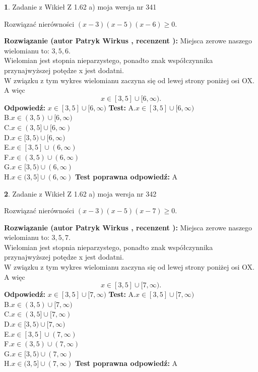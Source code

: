 \documentclass[12pt, a4paper]{article}
\theoremstyle{definition} %
\newtheorem{zad}{}
\newcommand{\zadStart}[1]{\begin{zad}#1\newline}
\newcommand{\zadStop}{\end{zad}}
\newcommand{\rozwStart}[2]{\noindent \textbf{Rozwiązanie (autor #1 , recenzent #2): }\newline}
\newcommand{\rozwStop}{\newline}
\newcommand{\odpStart}{\noindent \textbf{Odpowiedź:}\newline}
\newcommand{\odpStop}{\newline}
\newcommand{\testStart}{\noindent \textbf{Test:}\newline}
\newcommand{\testStop}{\newline}
\newcommand{\kluczStart}{\noindent \textbf{Test poprawna odpowiedź:}\newline}
\newcommand{\kluczStop}{\newline}
\begin{document}
\zadStart{Zadanie z Wikieł Z 1.62 a) moja wersja nr 341}

Rozwiązać nierówności $(x-3)(x-5)(x-6)\ge0$.
\zadStop
\rozwStart{Patryk Wirkus}{}
Miejsca zerowe naszego wielomianu to: $3, 5, 6$.\\
Wielomian jest stopnia nieparzystego, ponadto znak współczynnika przy\linebreak najwyższej potędze x jest dodatni.\\ W związku z tym wykres wielomianu zaczyna się od lewej strony poniżej osi OX. A więc $$x \in [3,5] \cup [6,\infty).$$
\rozwStop
\odpStart
$x \in [3,5] \cup [6,\infty)$
\odpStop
\testStart
A.$x \in [3,5] \cup [6,\infty)$\\
B.$x \in (3,5) \cup [6,\infty)$\\
C.$x \in (3,5] \cup [6,\infty)$\\
D.$x \in [3,5) \cup [6,\infty)$\\
E.$x \in [3,5] \cup (6,\infty)$\\
F.$x \in (3,5) \cup (6,\infty)$\\
G.$x \in [3,5) \cup (6,\infty)$\\
H.$x \in (3,5] \cup (6,\infty)$
\testStop
\kluczStart
A
\kluczStop



\zadStart{Zadanie z Wikieł Z 1.62 a) moja wersja nr 342}

Rozwiązać nierówności $(x-3)(x-5)(x-7)\ge0$.
\zadStop
\rozwStart{Patryk Wirkus}{}
Miejsca zerowe naszego wielomianu to: $3, 5, 7$.\\
Wielomian jest stopnia nieparzystego, ponadto znak współczynnika przy\linebreak najwyższej potędze x jest dodatni.\\ W związku z tym wykres wielomianu zaczyna się od lewej strony poniżej osi OX. A więc $$x \in [3,5] \cup [7,\infty).$$
\rozwStop
\odpStart
$x \in [3,5] \cup [7,\infty)$
\odpStop
\testStart
A.$x \in [3,5] \cup [7,\infty)$\\
B.$x \in (3,5) \cup [7,\infty)$\\
C.$x \in (3,5] \cup [7,\infty)$\\
D.$x \in [3,5) \cup [7,\infty)$\\
E.$x \in [3,5] \cup (7,\infty)$\\
F.$x \in (3,5) \cup (7,\infty)$\\
G.$x \in [3,5) \cup (7,\infty)$\\
H.$x \in (3,5] \cup (7,\infty)$
\testStop
\kluczStart
A
\kluczStop
\end{document}
